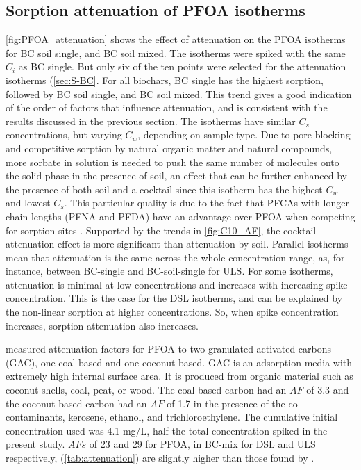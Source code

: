 \subsection{Sorption attenuation of PFOA isotherms}
\cref{fig:PFOA_attenuation} shows the effect of attenuation on the PFOA isotherms for BC soil single, and BC soil mixed. The isotherms were spiked with the same $C_i$ as BC single. But only six of the ten points were selected for the attenuation isotherms (\cref{sec:S-BC}. For all biochars, BC single has the highest sorption, followed by BC soil single, and BC soil mixed. This trend gives a good indication of the order of factors that influence attenuation, and is consistent with the results discussed in the previous section. The isotherms have similar $C_s$ concentrations, but varying $C_w$, depending on sample type. Due to pore blocking and competitive sorption by natural organic matter and natural compounds, more sorbate in solution is needed to push the same number of molecules onto the solid phase in the presence of soil, an effect that can be further enhanced by the presence of both soil and a cocktail since this isotherm has the highest $C_w$ and lowest $C_s$. This particular quality is due to the fact that PFCAs with longer chain lengths (PFNA and PFDA) have an advantage over PFOA when competing for sorption sites \citep{Sormo2021}. Supported by the trends in \cref{fig:C10_AF}, the cocktail attenuation effect is more significant than attenuation by soil. Parallel isotherms mean that attenuation is the same across the whole concentration range, as, for instance, between BC-single and BC-soil-single for ULS. For some isotherms, attenuation is minimal at low concentrations and increases with increasing spike concentration. This is the case for the DSL isotherms, and can be explained by the non-linear sorption at higher concentrations. So, when spike concentration increases, sorption attenuation also increases. 

\cite{siriwardena2019influence} measured attenuation factors for PFOA to two granulated activated carbons (GAC), one coal-based and one coconut-based. GAC is an adsorption media with extremely high internal surface area. It is produced from organic material such as coconut shells, coal, peat, or wood. The coal-based carbon had an $AF$ of 3.3 and the coconut-based carbon had an $AF$ of 1.7 in the presence of the co-contaminants, kerosene, ethanol, and trichloroethylene. The cumulative initial concentration used was 4.1 mg/L, half the total concentration spiked in the present study. $AFs$ of 23 and 29 for PFOA, in BC-mix for DSL and ULS respectively, (\cref{tab:attenuation}) are slightly higher than those found by \cite{siriwardena2019influence}. 

